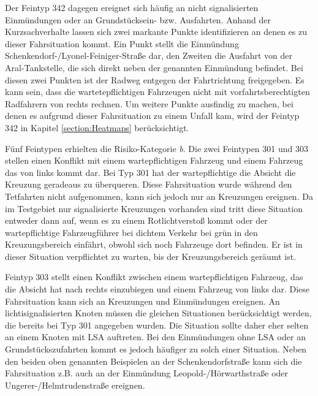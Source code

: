 Der Feintyp 342 dagegen ereignet sich häufig an nicht signalisierten Einmündungen oder an Grundstücksein- bzw. Ausfahrten. Anhand der Kurzsachverhalte lassen sich zwei markante Punkte identifizieren an denen es zu dieser Fahrsituation kommt. Ein Punkt stellt die Einmündung Schenkendorf-/Lyonel-Feiniger-Straße dar, den Zweiten die Ausfahrt von der Aral-Tankstelle, die sich direkt neben der genannten Einmündung befindet. Bei diesen zwei Punkten ist der Radweg entgegen der Fahrtrichtung freigegeben. Es kann sein, dass die wartetepflichtigen Fahrzeugen nicht mit vorfahrtsberechtigten Radfahrern von rechts rechnen. Um weitere Punkte ausfindig zu machen, bei denen es aufgrund dieser Fahrsituation zu einem Unfall kam, wird der Feintyp 342 in Kapitel \ref{section:Heatmaps} berücksichtigt.

Fünf Feintypen erhielten die Risiko-Kategorie \textit{b}. Die zwei Feintypen 301 und 303 stellen einen Konflikt mit einem wartepflichtigen Fahrzeug und einem Fahrzeug das von links kommt dar. Bei Typ 301 hat der wartepflichtige die Absicht die Kreuzung geradeaus zu überqueren. Diese Fahrsituation wurde während den Tetfahrten nicht aufgenommen, kann sich jedoch nur an Kreuzungen ereignen. Da im Testgebiet nur signalisierte Kreuzungen vorhanden sind tritt diese Situation entweder dann auf, wenn es zu einem Rotlichtverstoß kommt oder der wartepflichtige Fahrzeugführer bei dichtem Verkehr bei grün in den Kreuzungsbereich einfährt, obwohl sich noch Fahrzeuge dort befinden. Er ist in dieser Situation verpflichtet zu warten, bis der Kreuzungsbereich geräumt ist.

Feintyp 303 stellt einen Konflikt zwischen einem wartepflichtigen Fahrzeug, das die Absicht hat nach rechts einzubiegen und einem Fahrzeug von links dar. Diese Fahrsituation kann sich an Kreuzungen und Einmündungen ereignen. An lichtisignalisierten Knoten müssen die gleichen Situationen berücksichtigt werden, die bereits bei Typ 301 angegeben wurden. Die Situation sollte daher eher selten an einem Knoten mit \ac{LSA} auftreten. Bei den Einmündungen ohne \ac{LSA} oder an Grundstückszufahrten kommt es jedoch häufiger zu solch einer Situation. Neben den beiden oben genannten Beispielen an der Schenkendorfstraße kann sich die Fahrsituation z.B. auch an der Einmündung Leopold-/Hörwarthstraße oder Ungerer-/Helmtrudenstraße ereignen.


